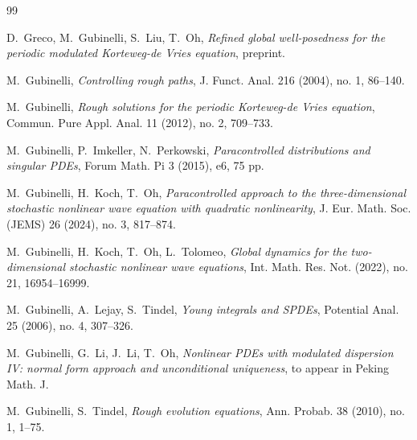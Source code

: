 \documentclass[letterpaper, 11pt,  reqno]{amsart}
\newcommand{\1}{\hspace{0.5mm}\text{I}\hspace{0.5mm}}
\numberwithin{equation}{section}
\numberwithin{theorem}{section}
\begin{document}
\begin{thebibliography}{99}



D.~Greco, M.~Gubinelli, S.~Liu, T.~Oh, 
{\it  Refined global well-posedness for the periodic modulated Korteweg-de Vries equation}, 
preprint.

M.~Gubinelli,
{\it Controlling rough paths},
J. Funct. Anal. 216 (2004), no. 1, 86--140.



M.~Gubinelli, 
{\it Rough solutions for the periodic Korteweg-de Vries equation},
Commun. Pure Appl. Anal. 11 (2012), no. 2, 709--733.





M.~Gubinelli, P.~Imkeller, N.~Perkowski,
{\it Paracontrolled distributions and singular PDEs},
Forum Math. Pi 3 (2015), e6, 75 pp.

%
%
%

M.~Gubinelli, H.~Koch, T.~Oh, 
{\it  Paracontrolled approach to the three-dimensional stochastic nonlinear wave equation with quadratic nonlinearity},  
J. Eur. Math. Soc. (JEMS) 26 (2024), no. 3, 817--874. 

%
%
%

M.~Gubinelli, H.~Koch, T.~Oh, L.~Tolomeo,
{\it  Global dynamics for the two-dimensional stochastic nonlinear wave equations},
 Int. Math. Res. Not. (2022), no. 21, 16954--16999. 


M.~Gubinelli, A.~Lejay, S.~Tindel,
{\it Young integrals and SPDEs},
Potential Anal. 25 (2006), no. 4, 307--326.


M.~Gubinelli, G.~Li, J.~Li, T.~Oh, 
{\it Nonlinear PDEs with modulated dispersion IV: 
normal form approach and unconditional uniqueness}, 
to appear in Peking Math. J.


%


M.~Gubinelli, S.~Tindel,
{\it Rough evolution equations},
Ann. Probab. 38 (2010), no. 1, 1--75.




\end{thebibliography}
\end{document}
